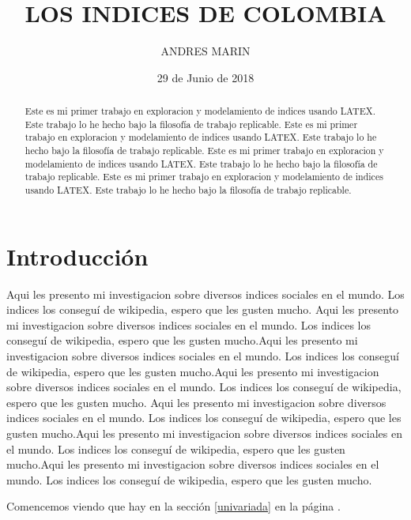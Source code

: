 \documentclass{article}
\title{LOS INDICES DE COLOMBIA}
\author[1]{\normalsize ANDRES MARIN}
\affil[1]{\small  Escuela de Ingeniería,Universidad de los Andes\\
\texttt{{ja.marin11}@uniandes.edu.co}}
\date{29 de Junio de 2018}
\begin{document}


\maketitle


\begin{abstract}
Este es mi primer trabajo en exploracion y modelamiento de indices usando LATEX. Este trabajo lo he hecho bajo la filosofía de trabajo replicable. Este es mi primer trabajo en exploracion y modelamiento de indices usando LATEX. Este trabajo lo he hecho bajo la filosofía de trabajo replicable. Este es mi primer trabajo en exploracion y modelamiento de indices usando LATEX. Este trabajo lo he hecho bajo la filosofía de trabajo replicable. Este es mi primer trabajo en exploracion y modelamiento de indices usando LATEX. Este trabajo lo he hecho bajo la filosofía de trabajo replicable.
\end{abstract}

\section*{Introducción}

Aqui les presento mi investigacion sobre diversos indices sociales en el mundo. Los indices los conseguí de wikipedia, espero que les gusten mucho. Aqui les presento mi investigacion sobre diversos indices sociales en el mundo. Los indices los conseguí de wikipedia, espero que les gusten mucho.Aqui les presento mi investigacion sobre diversos indices sociales en el mundo. Los indices los conseguí de wikipedia, espero que les gusten mucho.Aqui les presento mi investigacion sobre diversos indices sociales en el mundo. Los indices los conseguí de wikipedia, espero que les gusten mucho.
Aqui les presento mi investigacion sobre diversos indices sociales en el mundo. Los indices los conseguí de wikipedia, espero que les gusten mucho.Aqui les presento mi investigacion sobre diversos indices sociales en el mundo. Los indices los conseguí de wikipedia, espero que les gusten mucho.Aqui les presento mi investigacion sobre diversos indices sociales en el mundo. Los indices los conseguí de wikipedia, espero que les gusten mucho.

Comencemos viendo que hay en la sección \ref{univariada} en la página \pageref{univariada}.

\clearpage
\end{document}
